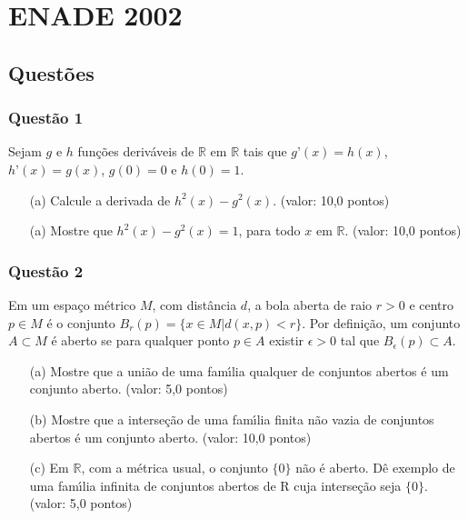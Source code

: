 \documentclass{report}
\begin{document}
\chapter{ENADE 2002}

\section{\color{blue} Quest\~oes}

\subsection{\color{blue} Quest\~ao 1}

Sejam $g$ e $h$ fun\c c\~oes deriv\'aveis de $\mathbb R$ em $\mathbb R$ tais que $g’(x)=h(x)$, $h’(x)=g(x)$, $g(0)=0$ e $h(0)=1$.

\begin{enumerate}

\item[(a)] Calcule a derivada de $h^2(x) - g^2(x)$. (valor: 10,0 pontos) 

\item[(a)] Mostre que $h^2(x) - g^2(x) = 1$, para todo $x$ em $\mathbb R$. (valor: 10,0 pontos)

\end{enumerate}

\subsection{\color{blue} Quest\~ao 2}

Em um espa\c co m\'etrico $M$, com dist\^ancia $d$, a bola aberta de raio $r > 0$ e centro $p\in M$ \'e o conjunto $B_r(p) = \{x\in M | d(x,p) < r\}$. Por defini\c c\~ao, um conjunto $A \subset M$ \'e aberto se para qualquer ponto $p \in A$ existir $\epsilon > 0$ tal que $B_\epsilon(p) \subset A$.

\begin{enumerate}

\item[(a)] Mostre que a uni\~ao de uma fam\'\i lia qualquer de conjuntos abertos \'e um conjunto aberto. (valor: 5,0 pontos)

\item[(b)] Mostre que a interse\c c\~ao de uma fam\'\i lia finita n\~ao vazia de conjuntos abertos \'e um conjunto aberto. (valor: 10,0 pontos) 

\item[(c)] Em $\mathbb R$, com a m\'etrica usual, o conjunto $\{0\}$ n\~ao \'e aberto. D\^e exemplo de uma fam\'\i lia infinita de conjuntos abertos de R cuja interse\c c\~ao seja $\{0\}$. (valor: 5,0 pontos)

\end{enumerate}
\end{document}
